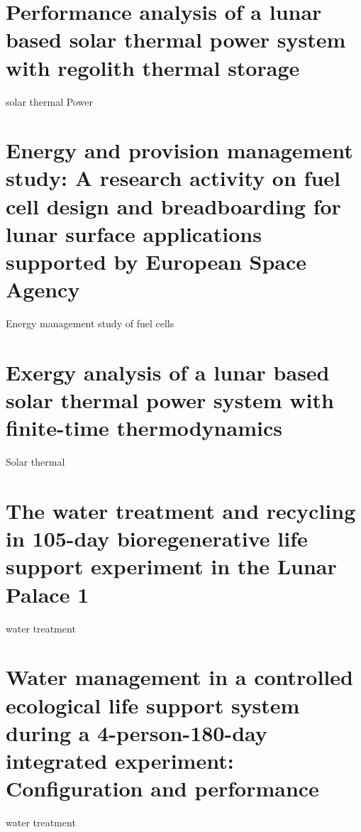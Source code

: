 \documentclass[prl,onecolumn]{revtex4-1}  %
\begin{document}
\section{Performance analysis of a lunar based solar thermal power system with regolith thermal storage}solar thermal Power
\citep{Lu}

\section{Energy and provision management study: A research activity on fuel cell design and breadboarding for lunar surface applications supported by European Space Agency}
Energy management study of fuel cells\citep{Barbera}

\section{Exergy analysis of a lunar based solar thermal power system with finite-time thermodynamics}Solar thermal\citep{Yao}

\section{The water treatment and recycling in 105-day bioregenerative life support experiment in the Lunar Palace 1}
water treatment \citep{Xie}


\section{Water management in a controlled ecological life support system during a 4-person-180-day integrated experiment: Configuration and performance}
water treatment \citep{Zhang}
\end{document}
